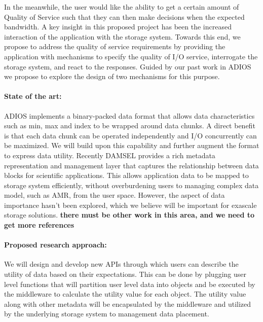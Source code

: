 In the meanwhile, the user would like the ability to get a certain amount of Quality of Service 
such that they can then make decisions when the expected bandwidth.
A key insight in this proposed project has been the increased interaction of
the application with the storage system. Towards this end, we propose to
address the quality of service requirements by providing the application
with mechanisms to specify the quality of I/O service, interrogate the
storage system, and react to the responses. Guided by our past work in
ADIOS \cite{lofstead2008flexible} we propose to explore the design of two
mechanisms for this purpose. 



\paragraph{State of the art:} ADIOS implements a binary-packed data format that allows
data characteristics such as min, max and index to be wrapped around data chunks. A
direct benefit is that each data chunk can be operated independently and I/O concurrently
can be maximized. We will build upon this capability and further augment the format
to express data utility. Recently DAMSEL \cite{damsel} provides a rich metadata representation
and management layer that captures the relationship between data blocks for scientific applications.
This allows application data to be mapped to storage system efficiently, without overburdening
users to managing complex data model, such as AMR, from the user space. However, the aspect of 
data importance hasn't been explored, which we believe will be important for exascale storage solutions. 
{\color{red}\bf there must be other work in this area, and we need to get more references}

\paragraph{Proposed research approach:} 
We will design and develop new APIs through which users can describe the utility of data
based on their expectations. This can be done by plugging user level functions that will
partition user level data into objects and be executed by the middleware to calculate the 
utility value for each object. The utility value along with other metadata will be encapsulated
by the middleware and utilized by the underlying storage system to management data placement.
%

